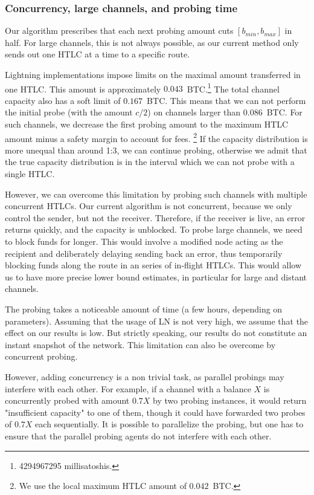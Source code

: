 \subsubsection*{Concurrency, large channels, and probing time}

Our algorithm prescribes that each next probing amount cuts $[b_{min}, b_{max}]$ in half.
For large channels, this is not always possible, as our current method only sends out one HTLC at a time to a specific route.

Lightning implementations impose limits on the maximal amount transferred in one HTLC.
This amount is approximately $0.043$~BTC.\footnote{4294967295 millisatoshis.}
The total channel capacity also has a soft limit of $0.167$~BTC.
This means that we can not perform the initial probe (with the amount $c / 2$) on channels larger than $0.086$~BTC.
For such channels, we decrease the first probing amount to the maximum HTLC amount minus a safety margin to account for fees.
\footnote{We use the local maximum HTLC amount of $0.042$~BTC.}
If the capacity distribution is more unequal than around 1:3, we can continue probing, otherwise we admit that the true capacity distribution is in the interval which we can not probe with a single HTLC.

However, we can overcome this limitation by probing such channels with multiple concurrent HTLCs.
Our current algorithm is not concurrent, because we only control the sender, but not the receiver.
Therefore, if the receiver is live, an error returns quickly, and the capacity is unblocked.
To probe large channels, we need to block funds for longer.
This would involve a modified node acting as the recipient and deliberately delaying sending back an error, thus temporarily blocking funds along the route in an series of in-flight HTLCs.
This would allow us to have more precise lower bound estimates, in particular for large and distant channels.

The probing takes a noticeable amount of time (a few hours, depending on parameters).
Assuming that the usage of LN is not very high, we assume that the effect on our results is low.
But strictly speaking, our results do not constitute an instant snapshot of the network.
This limitation can also be overcome by concurrent probing.

However, adding concurrency is a non trivial task, as parallel probings may interfere with each other.
For example, if a channel with a balance $X$ is concurrently probed with amount $0.7X$ by two probing instances, it would return "insufficient capacity" to one of them, though it could have forwarded two probes of $0.7X$ each sequentially.
It is possible to parallelize the probing, but one has to ensure that the parallel probing agents do not interfere with each other.

